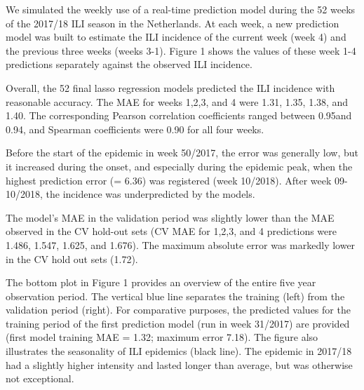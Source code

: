 \documentclass[]{article}
\begin{document}
We simulated the weekly use of a real-time prediction model during the
52 weeks of the 2017/18 ILI season in the Netherlands. At each week, a
new prediction model was built to estimate the ILI incidence of the
current week (week 4) and the previous three weeks (weeks 3-1). Figure 1
shows the values of these week 1-4 predictions separately against the
observed ILI incidence.

Overall, the 52 final lasso regression models predicted the ILI
incidence with reasonable accuracy. The MAE for weeks 1,2,3, and 4 were
1.31, 1.35, 1.38, and 1.40. The corresponding Pearson correlation
coefficients ranged between 0.95and 0.94, and Spearman coefficients were
0.90 for all four weeks.

Before the start of the epidemic in week 50/2017, the error was
generally low, but it increased during the onset, and especially during
the epidemic peak, when the highest prediction error (= 6.36) was
registered (week 10/2018). After week 09-10/2018, the incidence was
underpredicted by the models.

The model's MAE in the validation period was slightly lower than the MAE
observed in the CV hold-out sets (CV MAE for 1,2,3, and 4 predictions
were 1.486, 1.547, 1.625, and 1.676). The maximum absolute error was
markedly lower in the CV hold out sets (1.72).

The bottom plot in Figure 1 provides an overview of the entire five year
observation period. The vertical blue line separates the training (left)
from the validation period (right). For comparative purposes, the
predicted values for the training period of the first prediction model
(run in week 31/2017) are provided (first model training MAE = 1.32;
maximum error 7.18). The figure also illustrates the seasonality of ILI
epidemics (black line). The epidemic in 2017/18 had a slightly higher
intensity and lasted longer than average, but was otherwise not
exceptional.
\end{document}
